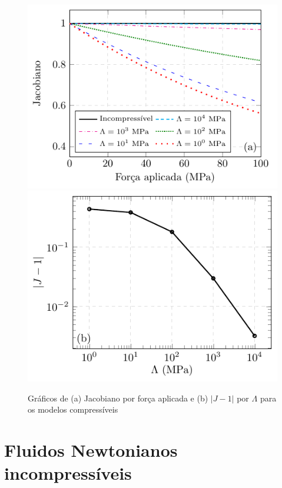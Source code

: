 \documentclass[Tese.tex]{subfiles}
\begin{document}
\begin{figure}[!h]
	\centering
	\caption{Gráficos de (a) Jacobiano por força aplicada e (b) $|J-1|$ por $\Lambda$ para os modelos compressíveis}
	\label{fig:SimpleAxialCube3D-Jacobian}
	\includegraphics[scale=0.95]{Figuras/SimpleAxialCube3D/SimpleAxialCube3D-Jacobian.pdf}\;\;\includegraphics[scale=0.95]{Figuras/SimpleAxialCube3D/SimpleAxialCube3D-JacobianDifference.pdf}
\end{figure}

\section{Fluidos Newtonianos incompressíveis}\label{sec:incompressivelFluido}
\end{document}
